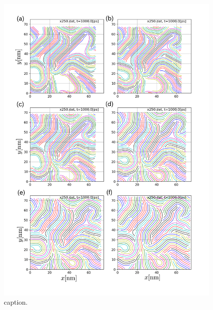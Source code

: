 \begin{figure}[h]
	\begin{center}
	\includegraphics[width=1.0\linewidth]{Figs/fig4.pdf} 
	\end{center}
	\caption{
		caption.
	} 
	\label{fig:fig4}
\end{figure}
